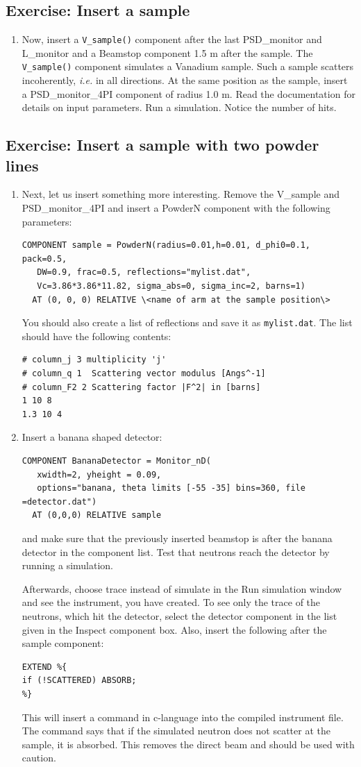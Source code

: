 \subsection{Exercise: Insert a sample}
\begin{enumerate}
\item{Now, insert a \verb+V_sample()+ component after the last PSD\_monitor and L\_monitor and a Beamstop component 1.5 m after the sample. The \verb+V_sample()+ component simulates a Vanadium sample. Such a sample scatters incoherently, \emph{i.e.} in all directions. At the same position as the sample, insert a PSD\_monitor\_4PI component of radius 1.0 m. Read the documentation for details on input parameters. Run a simulation. Notice the number of hits.}
\end{enumerate}
\subsection{Exercise: Insert a sample with two powder lines}
\begin{enumerate}
\item{Next, let us insert something more interesting. Remove the V\_sample and  PSD\_monitor\_4PI and insert a PowderN component with the following parameters:
    \begin{verbatim}
COMPONENT sample = PowderN(radius=0.01,h=0.01, d_phi0=0.1, pack=0.5, 
   DW=0.9, frac=0.5, reflections="mylist.dat",
   Vc=3.86*3.86*11.82, sigma_abs=0, sigma_inc=2, barns=1)
  AT (0, 0, 0) RELATIVE \<name of arm at the sample position\>
\end{verbatim}
You should also create a list of reflections and save it as \texttt{mylist.dat}. The list should have the following contents:
\begin{verbatim}
# column_j 3 multiplicity 'j'
# column_q 1  Scattering vector modulus [Angs^-1]
# column_F2 2 Scattering factor |F^2| in [barns]
1 10 8
1.3 10 4
\end{verbatim}
}
\item{Insert a banana shaped detector:
\begin{verbatim}
COMPONENT BananaDetector = Monitor_nD(
   xwidth=2, yheight = 0.09, 
   options="banana, theta limits [-55 -35] bins=360, file =detector.dat")
  AT (0,0,0) RELATIVE sample
\end{verbatim}
and make sure that the previously inserted beamstop is after the banana detector in the component list. Test that neutrons reach the detector by running a simulation. 

Afterwards, choose trace instead of simulate in the Run simulation window and see the instrument, you have created. To see only the trace of the neutrons, which hit the detector, select the detector component in the list given in the Inspect component box. Also, insert the following after the sample component:
\begin{verbatim}
EXTEND %{ 
if (!SCATTERED) ABSORB;
%}
\end{verbatim}
This will insert a command in c-language into the compiled instrument file. The command says that if the simulated neutron does not scatter at the sample, it is absorbed. This removes the direct beam and should be used with caution.}
\end{enumerate}
